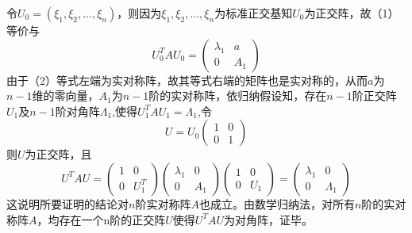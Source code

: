 \documentclass{ctexart}
\begin{document}
令$U_0=(\xi_1,\xi_2,…,\xi_n)$，则因为$\xi_1,\xi_2,…,\xi_n$为标准正交基知$U_0$为正交阵，故（1）等价与
\begin{equation}
    U_0^TAU_0=\begin{pmatrix}
  \lambda_1 & a\\
  0  & A_1
\end{pmatrix}
\end{equation}
由于（2）等式左端为实对称阵，故其等式右端的矩阵也是实对称的，从而$a$为$n-1$维的零向量，$A_1$为$n-1$阶的实对称阵，依归纳假设知，存在$n-1$阶正交阵$U_1$及$n-1$阶对角阵$\Lambda_1$,使得$U_1^TAU_1=\Lambda_1$,令
\begin{equation}
    U=U_0\begin{pmatrix}
  1 & 0\\
  0  & 1
\end{pmatrix}
\end{equation}
则$U$为正交阵，且
\begin{equation}
    U^TAU=\begin{pmatrix}
  1 & 0\\
  0  & U_1^T
\end{pmatrix}
 \begin{pmatrix}
  \lambda_1 & 0\\
  0  & A_1
\end{pmatrix}
 \begin{pmatrix}
 1 & 0\\
  0  & U_1
\end{pmatrix}=\begin{pmatrix}
 \lambda_1 & 0\\
  0  & \Lambda_1
\end{pmatrix}
\end{equation}
这说明所要证明的结论对$n$阶实对称阵$A$也成立。由数学归纳法，对所有$n$阶的实对称阵$A$，均存在一个n阶的正交阵$U$使得$U^TAU$为对角阵，证毕。
\end{document}
